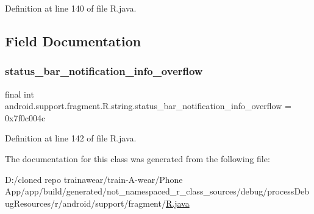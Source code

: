 Definition at line 140 of file R.\+java.


\begin{DoxyCode}{0}

\end{DoxyCode}


\subsection{Field Documentation}
\mbox{\label{classandroid_1_1support_1_1fragment_1_1_r_1_1string_afe54f0256b7cd91c2b0175f6dd55f9cc}} 
\subsubsection{\texorpdfstring{status\_bar\_notification\_info\_overflow}{status\_bar\_notification\_info\_overflow}}
{\footnotesize\ttfamily final int android.\+support.\+fragment.\+R.\+string.\+status\+\_\+bar\+\_\+notification\+\_\+info\+\_\+overflow = 0x7f0c004c\hspace{0.3cm}{\ttfamily [static]}}



Definition at line 142 of file R.\+java.



The documentation for this class was generated from the following file\+:\begin{DoxyCompactItemize}
\item 
D\+:/cloned repo trainawear/train-\/\+A-\/wear/\+Phone App/app/build/generated/not\+\_\+namespaced\+\_\+r\+\_\+class\+\_\+sources/debug/process\+Debug\+Resources/r/android/support/fragment/\mbox{\hyperlink{process_debug_resources_2r_2android_2support_2fragment_2_r_8java}{R.\+java}}\end{DoxyCompactItemize}
